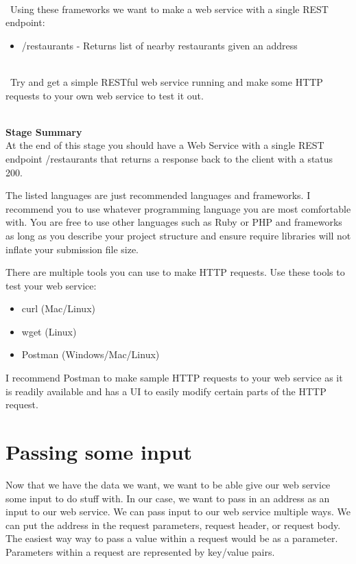 \documentclass{article}
\newenvironment{info}[1][Info:]{ %
	\medskip
	\begin{mdframed}[style=info]
		\noindent{\textbf{#1}}
}{
	\end{mdframed}
}
\begin{document}
\-\\\ Using these frameworks we want to make a web service with a single REST endpoint:
\begin{itemize}
\item /restaurants - Returns list of nearby restaurants given an address
\end{itemize}

\-\\\ Try and get a simple RESTful web service running and make some HTTP requests to your own web service to test it out. 

\-\ \\
\textbf{Stage Summary}\\
At the end of this stage you should have a Web Service with a single REST endpoint /restaurants that returns a response back to the client with a status 200.

\begin{info}[Note:]
The listed languages are just recommended languages and frameworks. I recommend you to use whatever programming language you are most comfortable with. You are free to use other languages such as Ruby or PHP and frameworks as long as you describe your project structure and ensure require libraries will not inflate your submission file size.
\end{info}

\begin{info}[Testing your web service:]
There are multiple tools you can use to make HTTP requests. Use these tools to test your web service:
\begin{itemize}
\item curl (Mac/Linux)
\item wget (Linux)
\item Postman (Windows/Mac/Linux)
\end{itemize}
I recommend Postman to make sample HTTP requests to your web service as it is readily available and has a UI to easily modify certain parts of the HTTP request. 
\end{info}



\section{Passing some input}
Now that we have the data we want, we want to be able give our web service some input to do stuff with. In our case, we want to pass in an address as an input to our web service. We can pass input to our web service multiple ways. We can put the address in the request parameters, request header, or request body. The easiest way way to pass a value within a request would be as a parameter. Parameters within a request are represented by key/value pairs.
\end{document}
